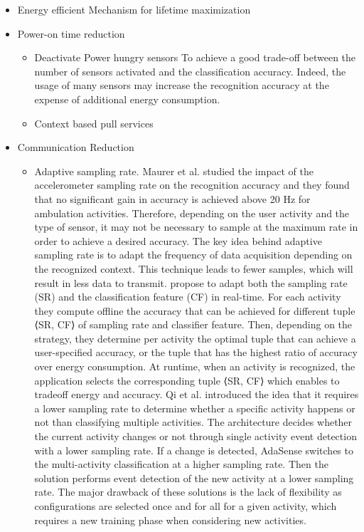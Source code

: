 \documentclass[letterpaper, 10pt, conference]{IEEEtran} %
\begin{document}
\begin{itemize}
\item Energy efficient Mechanism for lifetime maximization
\item{Power-on time reduction}
\begin{itemize}
    \item  Deactivate Power hungry sensors\cite{rahmati2007context,Nath2013,Park2011}
    To achieve a good trade-off between the number of sensors activated and the classification accuracy. Indeed, the usage of many sensors may increase the recognition accuracy at the expense of additional energy consumption.
    
    \item{Context based pull services\cite{Rachuri2011,paschou2013health}}
    
\end{itemize}
\item Communication Reduction
\begin{itemize}
    \item Adaptive sampling rate\cite{qi2013adasense,Yan2012}. 
    Maurer et al. \cite{maurer2006activity} studied the impact of the accelerometer sampling rate on the recognition accuracy and they found that no significant gain in accuracy is achieved above 20 Hz for ambulation activities. Therefore, depending on the user activity and the type of sensor, it may not be necessary to sample at the maximum rate in order to achieve a desired accuracy. The key idea behind adaptive sampling rate is to adapt the frequency of data acquisition depending on the recognized context. This technique leads to fewer samples, which will result in less data to transmit.
    \cite{yan2012energy} propose to adapt both the sampling rate (SR) and the classification feature (CF) in real-time. For each activity they compute offline the accuracy that can be achieved for different tuple ⟨SR, CF⟩ of sampling rate and classifier feature. Then, depending on the strategy, they determine per activity the optimal tuple that can achieve a user-specified accuracy, or the tuple that has the highest ratio of accuracy over energy consumption. At runtime, when an activity is recognized, the application selects the corresponding tuple
⟨SR, CF⟩ which enables to tradeoff energy and accuracy. Qi et al.\cite{qi2013adasense} introduced the idea that it requires
a lower sampling rate to determine whether a specific activity happens or not than classifying multiple activities. The architecture decides whether the current activity changes or not through single activity event
detection with a lower sampling rate. If a change is detected, AdaSense switches to the multi-activity classification at a
higher sampling rate. Then the solution performs event detection of the new activity at a lower sampling rate. The major
drawback of these solutions is the lack of flexibility as configurations are selected once and for all for a given activity, which
requires a new training phase when considering new activities.
    

\end{itemize}
\end{itemize}
\end{document}
